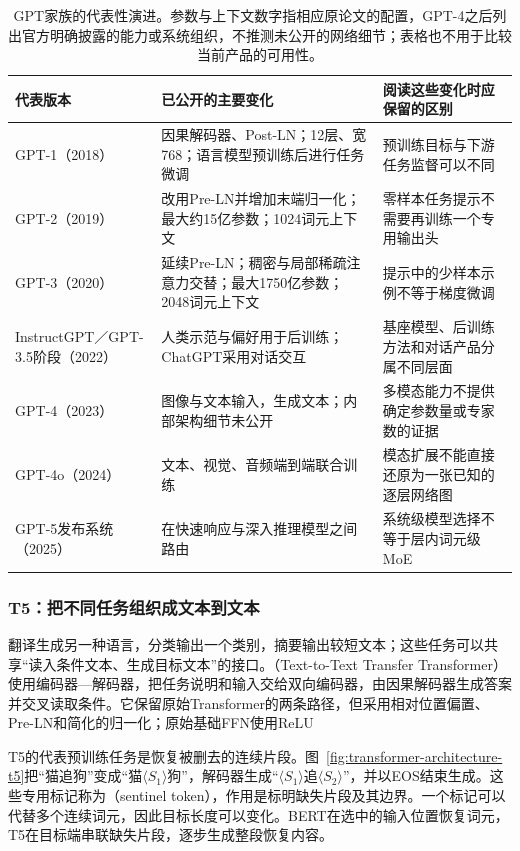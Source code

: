 \begin{table}[p]
  \centering
  \small
  \begin{tabular}{@{}p{25mm}p{64mm}p{66mm}@{}}
    \toprule
    代表版本 & 已公开的主要变化 & 阅读这些变化时应保留的区别 \\
    \midrule
    GPT-1（2018） & 因果解码器、Post-LN；12层、宽768；语言模型预训练后进行任务微调 & 预训练目标与下游任务监督可以不同 \\
    GPT-2（2019） & 改用Pre-LN并增加末端归一化；最大约15亿参数；1024词元上下文 & 零样本任务提示不需要再训练一个专用输出头 \\
    GPT-3（2020） & 延续Pre-LN；稠密与局部稀疏注意力交替；最大1750亿参数；2048词元上下文 & 提示中的少样本示例不等于梯度微调 \\
    InstructGPT／GPT-3.5阶段（2022） & 人类示范与偏好用于后训练；ChatGPT采用对话交互 & 基座模型、后训练方法和对话产品分属不同层面 \\
    GPT-4（2023） & 图像与文本输入，生成文本；内部架构细节未公开 & 多模态能力不提供确定参数量或专家数的证据 \\
    GPT-4o（2024） & 文本、视觉、音频端到端联合训练 & 模态扩展不能直接还原为一张已知的逐层网络图 \\
    GPT-5发布系统（2025） & 在快速响应与深入推理模型之间路由 & 系统级模型选择不等于层内词元级MoE \\
    \bottomrule
  \end{tabular}
  \caption{GPT家族的代表性演进。参数与上下文数字指相应原论文的配置，GPT-4之后列出官方明确披露的能力或系统组织，不推测未公开的网络细节；表格也不用于比较当前产品的可用性。}
  \label{tab:transformer-gpt-generations}
\end{table}
\FloatBarrier

\subsubsection{T5：把不同任务组织成文本到文本}

翻译生成另一种语言，分类输出一个类别，摘要输出较短文本；这些任务可以共享“读入条件文本、生成目标文本”的接口。（Text-to-Text Transfer Transformer）使用编码器—解码器，把任务说明和输入交给双向编码器，由因果解码器生成答案并交叉读取条件。它保留原始Transformer的两条路径，但采用相对位置偏置、Pre-LN和简化的归一化；原始基础FFN使用ReLU

T5的代表预训练任务是恢复被删去的连续片段。图~\ref{fig:transformer-architecture-t5}把“猫追狗”变成“猫$\langle S_1\rangle$狗”，解码器生成“$\langle S_1\rangle$追$\langle S_2\rangle$”，并以EOS结束生成。这些专用标记称为（sentinel token），作用是标明缺失片段及其边界。一个标记可以代替多个连续词元，因此目标长度可以变化。BERT在选中的输入位置恢复词元，T5在目标端串联缺失片段，逐步生成整段恢复内容。

